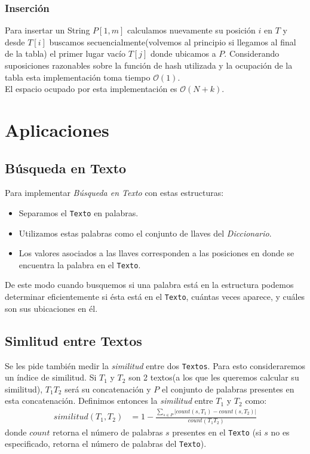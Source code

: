 \documentclass[dcc,uchile]{fcfmcourse}
\begin{document}
\subsubsection*{Inserción}
Para insertar un String $P[1,m]$ calculamos nuevamente su posición $i$ en $T$ y desde $T[i]$ buscamos secuencialmente(volvemos al principio si llegamos al final de la tabla) el primer lugar vacío $T[j]$ donde ubicamos a $P$. Considerando suposiciones razonables sobre la función de hash utilizada y la ocupación de la tabla esta implementación toma tiempo $\mathcal{O}(1)$.\\

El espacio ocupado por esta implementación es $\mathcal{O}(N+k)$.

\section{Aplicaciones}
\subsection{Búsqueda en Texto}
Para implementar \textit{Búsqueda en Texto} con estas estructuras:
\begin{itemize}
\item Separamos el \texttt{Texto} en palabras.
\item Utilizamos estas palabras como el conjunto de llaves del \textit{Diccionario}.
\item Los valores asociados a las llaves corresponden a las posiciones en donde se encuentra la palabra en el \texttt{Texto}.
\end{itemize}
De este modo cuando busquemos si una palabra está en la estructura podemos determinar eficientemente si ésta está en el \texttt{Texto}, cuántas veces aparece, y cuáles son sus ubicaciones en él.
\subsection{Simlitud entre Textos}
Se les pide también medir la \textit{similitud} entre dos \texttt{Textos}. Para esto consideraremos un índice de similitud. Si $T_{1}$ y $T_{2}$ son 2 textos(a los que les queremos calcular su similitud), $T_{1}T_{2}$ será su concatenación y $P$ el conjunto de palabras presentes en esta concatenación. Definimos entonces la \textit{similitud} entre $T_{1}$ y $T_{2}$ como:
\begin{align*}
similitud(T_{1}, T_{2}) &= 1 - \frac{\sum_{s\in P}|count(s,T_{1})-count(s,T_{2})|}{count(T_{1}T_{2})}
\end{align*}
donde $count$ retorna el número de palabras $s$ presentes en el \texttt{Texto} (si $s$ no es especificado, retorna el número de palabras del \texttt{Texto}).\\
\end{document}
